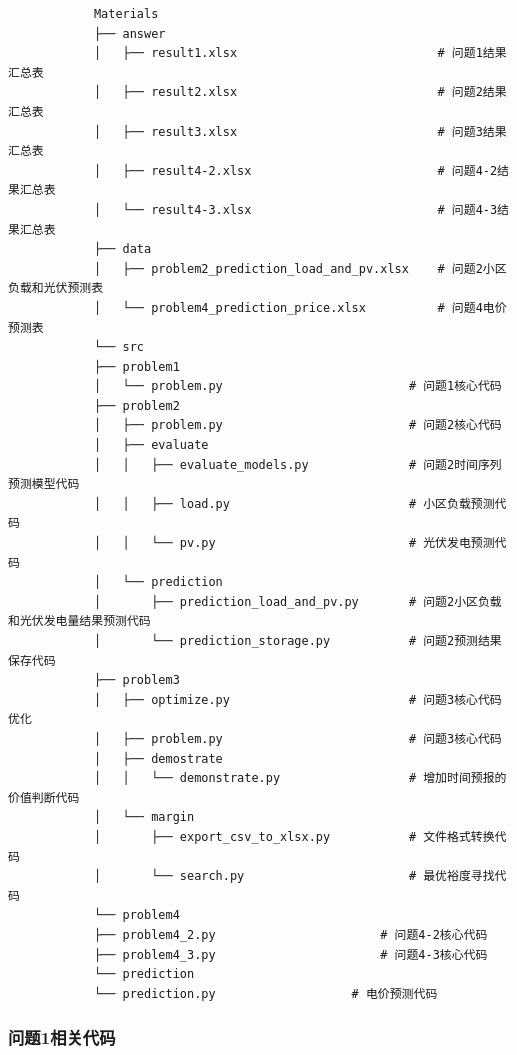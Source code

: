\documentclass[UTF8]{ctexart}
\begin{document}
    \begin{tcolorbox}[breakable, colback=gray!10, colframe=black!70, boxrule=0.4pt, arc=0pt,
        left=6pt, right=6pt, top=5pt, bottom=5pt]
        \begingroup
        \makeatletter
        \renewcommand\verbatim@font{\treefont\small}
        \makeatother
        \begin{verbatim}
            Materials
            ├── answer
            │   ├── result1.xlsx							# 问题1结果汇总表
            │   ├── result2.xlsx							# 问题2结果汇总表
            │   ├── result3.xlsx							# 问题3结果汇总表
            │   ├── result4-2.xlsx							# 问题4-2结果汇总表
            │   └── result4-3.xlsx							# 问题4-3结果汇总表
            ├── data
            │   ├── problem2_prediction_load_and_pv.xlsx	# 问题2小区负载和光伏预测表
            │   └── problem4_prediction_price.xlsx			# 问题4电价预测表
            └── src
            ├── problem1
            │   └── problem.py							# 问题1核心代码
            ├── problem2
            │   ├── problem.py							# 问题2核心代码
            │   ├── evaluate
            │   │   ├── evaluate_models.py				# 问题2时间序列预测模型代码
            │   │   ├── load.py							# 小区负载预测代码
            │   │   └── pv.py							# 光伏发电预测代码
            │   └── prediction
            │       ├── prediction_load_and_pv.py		# 问题2小区负载和光伏发电量结果预测代码
            │       └── prediction_storage.py			# 问题2预测结果保存代码
            ├── problem3
            │   ├── optimize.py							# 问题3核心代码优化
            │   ├── problem.py							# 问题3核心代码
            │   ├── demostrate
            │   │   └── demonstrate.py					# 增加时间预报的价值判断代码
            │   └── margin
            │       ├── export_csv_to_xlsx.py			# 文件格式转换代码
            │       └── search.py						# 最优裕度寻找代码
            └── problem4
            ├── problem4_2.py						# 问题4-2核心代码
            ├── problem4_3.py						# 问题4-3核心代码
            └── prediction							
            └── prediction.py					# 电价预测代码
        \end{verbatim}
        \endgroup
    \end{tcolorbox}
    
    \subsubsection*{问题1相关代码}
    
\end{document}

